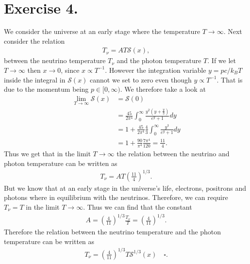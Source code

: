\documentclass{emulateapj}
\begin{document}
	\section*{Exercise 4.}
	We consider the universe at an early stage where the temperature $T\to\infty$. Next consider the relation
	\begin{align}
		T_\nu = AT\mathcal{S}(x),
	\end{align}
	between the neutrino temperature $T_\nu$ and the photon temperature $T$. If we let $T\to\infty$ then $x\to 0$, since $x\propto T^{-1}$. However the integration variable $y=pc/k_BT$ inside the integral in $\mathcal{S}(x)$ cannot we set to zero even though $y\propto T^{-1}$. That is due to the momentum being $p\in[0,\infty)$. We therefore take a look at 
	\begin{align}
		\lim_{T\to\infty}\mathcal{S}(x) &= \mathcal{S}(0) \\
		&=\frac{45}{2\pi^4}\int_{0}^{\infty}\frac{y^2(y + \frac{y}{3})}{e^y + 1}dy\\
		&=1 + \frac{45}{2\pi^4}\frac{4}{3}\int_{0}^{\infty}\frac{y^3}{e^y + 1}dy \\
		&= 1 + \frac{90}{\pi^4}\frac{7\pi^4}{120} = \frac{11}{4}.
	\end{align}
	Thus we get that in the limit $T\to\infty$ the relation between the neutrino and photon temperature can be written as 
	\begin{align}
		T_\nu = AT\left(\frac{11}{4}\right)^{1/3}.
	\end{align}
	But we know that at an early stage in the universe's life, electrons, positrons and photons where in equilibrium with the neutrinos. Therefore, we can require $T_\nu = T$ in the limit $T\to\infty$. Thus we can find that the constant 
	\begin{align}
		A = \left(\frac{4}{11}\right)^{1/3}\frac{T_\nu}{T} = \left(\frac{4}{11}\right)^{1/3}.
	\end{align}
	Therefore the relation between the neutrino temperature and the photon temperature can be written as
	\begin{align}
		T_\nu = \left(\frac{4}{11}\right)^{1/3}T\mathcal{S}^{1/3}(x)\quad\square.
	\end{align}
	
\end{document}
